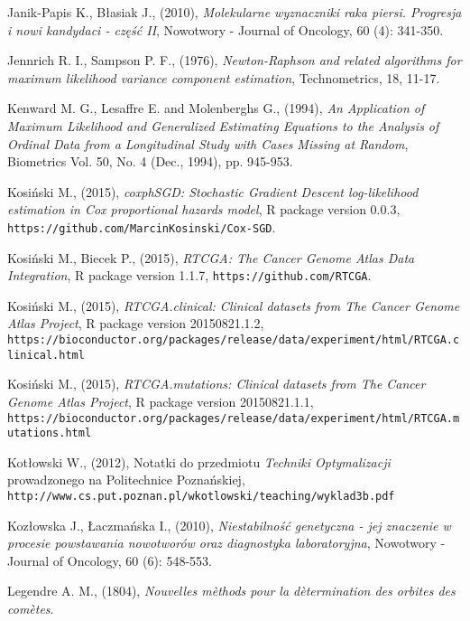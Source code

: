 \begin{thebibliography}{99}
 Janik-Papis K., Błasiak J., (2010), \textit{Molekularne wyznaczniki raka piersi. Progresja i nowi kandydaci - część II}, Nowotwory - Journal of Oncology, 60 (4): 341-350.

 Jennrich R. I., Sampson P. F., (1976), \textit{Newton-Raphson and related algorithms for maximum likelihood variance component estimation}, Technometrics, 18, 11-17.


 Kenward M. G., Lesaffre E. and Molenberghs G., (1994), \textit{An Application of Maximum Likelihood and Generalized Estimating Equations to the Analysis of Ordinal Data from a Longitudinal Study with Cases Missing at Random}, Biometrics
Vol. 50, No. 4 (Dec., 1994), pp. 945-953.


 Kosiński M., (2015), \textit{coxphSGD: Stochastic Gradient Descent log-likelihood estimation in Cox proportional hazards model}, R package version 0.0.3,  \texttt{https://github.com/MarcinKosinski/Cox-SGD}.

 Kosiński M., Biecek P., (2015), \textit{RTCGA: The Cancer Genome Atlas Data Integration}, R package version 1.1.7, \texttt{https://github.com/RTCGA}.

 Kosiński M., (2015), \textit{RTCGA.clinical: Clinical datasets from The Cancer Genome Atlas Project}, R package version 20150821.1.2, \\ \texttt{https://bioconductor.org/packages/release/data/experiment/html/RTCGA.clinical.html}

 Kosiński M., (2015), \textit{RTCGA.mutations: Clinical datasets from The Cancer Genome Atlas Project}, R package version 20150821.1.1, \\ \texttt{https://bioconductor.org/packages/release/data/experiment/html/RTCGA.mutations.html}

 Kotłowski W., (2012), Notatki do przedmiotu \textit{Techniki Optymalizacji} prowadzonego na Politechnice Poznańskiej, \\ \texttt{http://www.cs.put.poznan.pl/wkotlowski/teaching/wyklad3b.pdf}

 Kozłowska J., Łaczmańska I., (2010), \textit{Niestabilność genetyczna - jej znaczenie w procesie powstawania nowotworów oraz diagnostyka laboratoryjna}, Nowotwory - Journal of Oncology, 60 (6): 548-553.

 Legendre A. M., (1804), \textit{Nouvelles m\`ethods pour la d\`etermination des orbites des com\`etes}.



\end{thebibliography}
